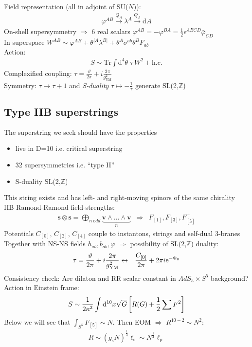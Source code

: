 \documentclass[12pt]{article}
\begin{document}
Field representation (all in adjoint of SU($N$)): 
\begin{eqnarray}
\varphi^{AB} \stackrel{Q_A}{\longrightarrow} \lambda^A\stackrel{Q_A}{\longrightarrow}\mathrm d A
\end{eqnarray}
On-shell supersymmetry $\Rightarrow$ 6 real scalars $\varphi^{AB}=-\varphi^{BA} = \frac12 \epsilon^{ABCD}\bar \varphi_{CD}$\\
In superspace $W^{AB}\sim \varphi^{AB} + \theta^{[A} \lambda^{B]} +\theta^A \sigma^{ab} \theta^B F_{ab}$\\
Action:
\begin{eqnarray}
S\sim \mathrm {Tr}\int \mathrm d^4\theta \,\,\tau \,W^2 +\mathrm{h.c.}
\end{eqnarray}
Complexified coupling: $\tau = \frac\vartheta{2\pi}+i\frac{2\pi}{g_\mathrm{YM}^2}$\\
Symmetry: $\tau \mapsto \tau+1$ and {\em S-duality} $\tau \mapsto -\frac1\tau$ generate SL(2,$\mathbb Z$)

\subsection{Type IIB superstrings}
The superstring we seek should have the properties
\begin{itemize}
\item live in D=10 i.e. critical superstring
\item 32 supersymmetries i.e. ``type II''
\item S-duality SL(2,$\mathbb Z$)
\end{itemize}
This string exists and has left- and right-moving spinors of the same chirality\\
IIB Ramond-Ramond field-strengths:
\begin{eqnarray}
\mathbf s \otimes \mathbf s = \bigoplus_{n~\mathrm odd} \underbrace{\mathbf v \wedge \dots \wedge \mathbf v}_{n}&\Rightarrow& F_{[1]},F_{[3]},F_{[5]}^+ 
\end{eqnarray}
Potentials $C_{[0]}$, $C_{[2]}$, $C_{[4]}$ couple to instantons, strings and self-dual 3-branes\\
Together with NS-NS fields $h_{ab}, b_{ab}, \varphi$ $\Rightarrow$ possibility of SL(2,$\mathbb Z$) duality:
\begin{eqnarray}
\tau = \frac\vartheta{2\pi}+i\frac{2\pi}{g_\mathrm{YM}^2} &\leftrightarrow& {{C_{[0]}}\over {2\pi}}+{2\pi}i\mathrm e^{-\Phi_0}
\end{eqnarray}
Consistency check: Are dilaton and RR scalar constant in $AdS_5\times S^5$ background?\\
Action in Einstein frame:
\begin{eqnarray}
S \sim {1\over 2 \kappa^2}\int\mathrm d^{10}x \sqrt{G} \left[ R(G) + \frac12 \sum F^2\right]
\end{eqnarray}
Below we will see that $\int_{S^5} F_{[5]} \sim N$. Then EOM $\Rightarrow$ $R^{10-2}\sim N^{2}$:
\begin{eqnarray}
R\sim (g_\mathrm s N)^{\frac14}\ell_\mathrm s\sim N^{\frac14} \ell_\mathrm p
\end{eqnarray}
\end{document}
